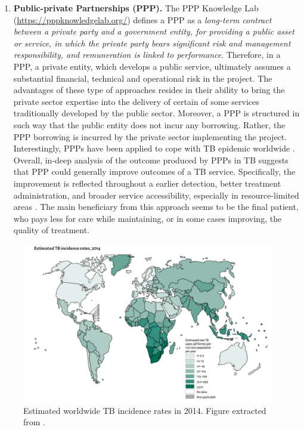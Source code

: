 \documentclass[12pt, b5paper,twoside]{tesi_upf}
\begin{document}
\begin{enumerate}
\item \textbf{Public-private Partnerships (PPP).} The PPP Knowledge Lab (\url{https://pppknowledgelab.org/}) defines a PPP as a \textit{long-term contract between a private party and a government entity, for providing a public asset or service, in which the private party bears significant risk and management responsibility, and remuneration is linked to performance}. Therefore, in a PPP, a private entity, which develops a public service, ultimately assumes a substantial financial, technical and operational risk in the project. The advantages of these type of approaches resides in their ability to bring the private sector expertise into the delivery of certain of some services traditionally developed by the public sector. Moreover, a PPP is structured in such way that the public entity does not incur any borrowing. Rather, the PPP borrowing is incurred by the private sector implementing the project. Interestingly,  PPPs have been applied to cope with TB epidemic worldwide \cite{Karki2007, Murthy2001}. Overall, in-deep analysis of the outcome produced by PPPs in TB suggests that PPP could generally improve outcomes of a TB service.  Specifically, the improvement is reflected throughout a earlier detection, better treatment administration, and broader service accessibility, especially in resource-limited areas \cite{Lei2015}. The main beneficiary from this approach seems to be the final patient, who pays less for care while maintaining, or in some cases improving, the quality of treatment. 

\end{enumerate}

\begin{figure}[htbp]
\centering
\includegraphics[width=0.9\linewidth]{../figures/map_incidence_tb.pdf}
	\caption[Estimated worldwide TB incidence rates in 2014]{Estimated worldwide TB incidence rates in 2014. Figure extracted from \cite{Lewandowski2015}.}
\label{fig:map_incidence_tb}
	
	\vspace*{4mm}
\end{figure}
\end{document}

